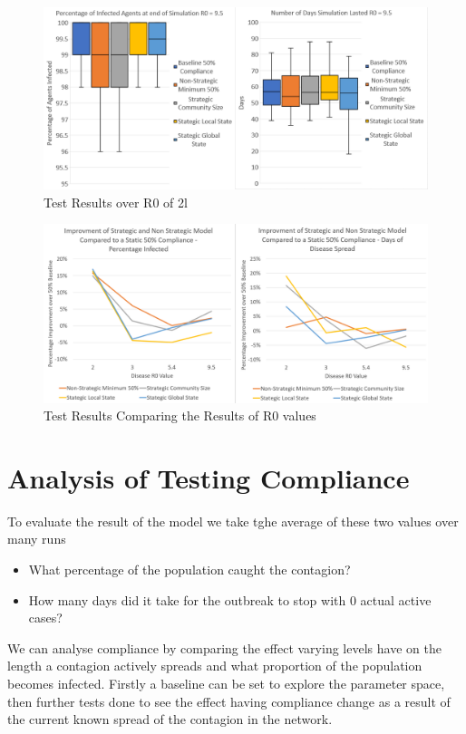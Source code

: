 \documentclass{article}
\begin{document}
\begin{figure}
  \centering
      \includegraphics[width=\textwidth]{2}
  \caption{Test Results over R0 of 2l}
\end{figure}

\begin{figure}
  \centering
      \includegraphics[width=\textwidth]{1}
  \caption{Test Results Comparing the Results of R0 values}
\end{figure}


\section{Analysis of Testing Compliance}

To evaluate the result of the model we take tghe average of these two values over many runs 
\begin{itemize}
\item What percentage of the population caught the contagion?
\item How many days did it take for the outbreak to stop with 0 actual active cases?
\end{itemize}

We can analyse compliance by comparing the effect varying levels have on the length a contagion actively spreads and what proportion of the population becomes infected. Firstly a baseline can be set to explore the parameter space, then further tests done to see the effect having compliance change as a result of the current known spread of the contagion in the network.
\end{document}
